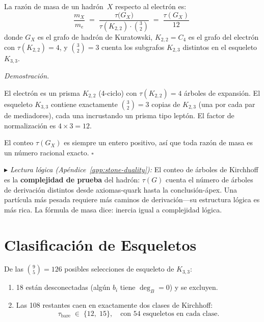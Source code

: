 \documentclass[11pt, a4paper, openany]{book}
\newcommand{\stoneref}[1]{%
  \smallskip\noindent
  {\small\color{structure!70}\textit{$\blacktriangleright$ Lectura
  l\'ogica (Ap\'endice~\ref{app:stone-duality}):} #1}%
  \smallskip}
\renewenvironment{proof}[1][Demostraci\'on]{%
  \par\noindent\textit{#1.}\quad
}{\hfill$\square$\par\medskip}
\begin{document}
\begin{theorem}
\label{thm:kirchhoff-mass}
La raz\'on de masa de un hadr\'on~$X$ respecto al electr\'on es:
\begin{equation}
  \boxed{\;
  \frac{m_X}{m_e}
  \;=\; \frac{\tau\bigl(G_X\bigr)}
             {\tau(K_{2,2}) \cdot \binom{3}{2}}
  \;=\; \frac{\tau(G_X)}{12}
  \;\;}
  \label{eq:kirchhoff-mass}
\end{equation}
donde $G_X$ es el grafo de hadr\'on de Kuratowski,
$K_{2,2} = C_4$ es el grafo del electr\'on con
$\tau(K_{2,2}) = 4$, y $\binom{3}{2} = 3$ cuenta los subgrafos
$K_{2,3}$ distintos en el esqueleto $K_{3,3}$.
\end{theorem}

\begin{proof}
El electr\'on es un prisma $K_{2,2}$ (4-ciclo) con
$\tau(K_{2,2}) = 4$ \'arboles de expansi\'on.  El esqueleto
$K_{3,3}$ contiene exactamente $\binom{3}{2} = 3$ copias de
$K_{2,3}$ (una por cada par de mediadores), cada una incrustando
un prisma tipo lept\'on.  El factor de normalizaci\'on es
$4 \times 3 = 12$.

El conteo $\tau(G_X)$ es siempre un entero positivo, as\'i que
toda raz\'on de masa es un n\'umero racional exacto.
\end{proof}

\stoneref{El conteo de \'arboles de Kirchhoff es la
\textbf{complejidad de prueba} del hadr\'on: $\tau(G)$ cuenta el
n\'umero de \'arboles de derivaci\'on distintos desde axiomas-quark
hasta la conclusi\'on-\'apex.  Una part\'icula m\'as pesada requiere
m\'as caminos de derivaci\'on---su estructura l\'ogica es m\'as rica.
La f\'ormula de masa dice: inercia igual a complejidad l\'ogica.}

\section{Clasificaci\'on de Esqueletos}
\label{sec:backbone-classification}

\begin{theorem}
\label{thm:two-backbone-classes}
De las $\binom{9}{5} = 126$ posibles selecciones de esqueleto de
$K_{3,3}$:
\begin{enumerate}
  \item 18 est\'an desconectadas (alg\'un $b_i$ tiene
    $\deg_B = 0$) y se excluyen.
  \item Las 108 restantes caen en exactamente dos clases de
    Kirchhoff:
    \[
      \tau_{\mathrm{bare}} \;\in\; \{12,\; 15\},
      \quad\text{con 54 esqueletos en cada clase.}
    \]
\end{enumerate}
\end{theorem}
\end{document}
